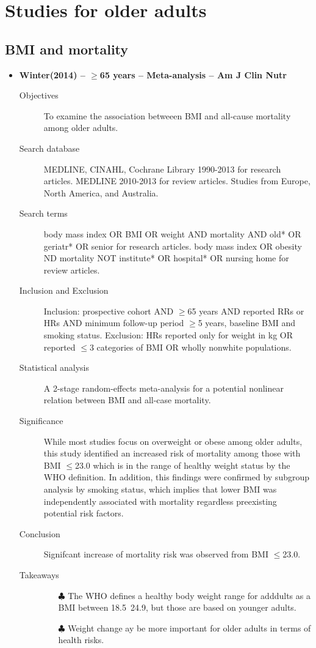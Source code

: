 \documentclass{article}
\begin{document}
\section{Studies for older adults}
\subsection{BMI and mortality}
\begin{itemize}	
	\item{\bf Winter(2014) -- $\geq$65 years -- Meta-analysis -- Am J Clin Nutr} 
		\begin{description}
			\item[Objectives]
				To examine the association betweeen BMI and all-cause mortality among older adults.
			\item[Search database] 
				MEDLINE, CINAHL, Cochrane Library 1990-2013 for research articles. MEDLINE 2010-2013 for review articles. Studies from Europe, North America, and Australia.
			\item[Search terms]
				body mass index OR BMI OR weight AND mortality AND old* OR geriatr* OR senior for research articles. body mass index OR obesity ND mortality NOT institute* OR hospital* OR nursing home for review articles.
			\item[Inclusion and Exclusion] 
				Inclusion: prospective cohort AND $\geq$65 years AND reported RRs or HRs AND minimum follow-up period $\geq$5 years, baseline BMI and smoking status. Exclusion: HRs reported only for weight in kg OR reported $\le$3 categories of BMI OR wholly nonwhite populations.
			\item[Statistical analysis] 
				A 2-stage random-effects meta-analysis for a potential nonlinear relation between BMI and all-case mortality.
			\item[Significance] 
				While most studies focus on overweight or obese among older adults, this study identified an increased risk of mortality among those with BMI $\le$23.0 which is in the range of healthy weight status by the WHO definition. In addition, this findings were confirmed by subgroup analysis by smoking status, which implies that lower BMI was independently associated with mortality regardless preexisting potential risk factors.
			\item[Conclusion] 
				Signifcant increase of mortality risk was observed from BMI $\le$23.0. 
			\item[Takeaways] \mbox{}\par
				\begin{itemize}
					\item[$\clubsuit$] The WHO defines a healthy body weight range for adddults as a BMI between 18.5~24.9, but those are based on younger adults.
					\item[$\clubsuit$] Weight change ay be more important for older adults in terms of health risks.
				\end{itemize}
		\end{description}

\end{itemize}
\end{document}
